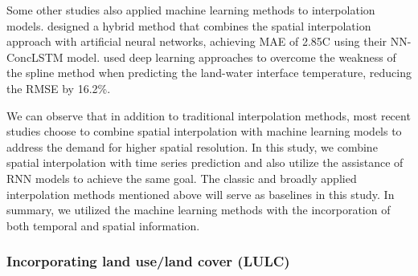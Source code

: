\documentclass[a4paper,fleqn]{cas-sc}
\begin{document}
Some other studies also applied machine learning methods to interpolation models. \cite{Kartal2022prediction} designed a hybrid method that combines the spatial interpolation approach with artificial neural networks, achieving MAE of 2.85\textdegree C using their NN-ConcLSTM model. \cite{imanian2023spatial} used deep learning approaches to overcome the weakness of the spline method when predicting the land-water interface temperature, reducing the RMSE by 16.2\%. 

We can observe that in addition to traditional interpolation methods, most recent studies choose to combine spatial interpolation with machine learning models to address the demand for higher spatial resolution. In this study, we combine spatial interpolation with time series prediction and also utilize the assistance of RNN models to achieve the same goal. The classic and broadly applied interpolation methods mentioned above will serve as baselines in this study. In summary, we utilized the machine learning methods with the incorporation of both temporal and spatial information.

\subsubsection{Incorporating land use/land cover (LULC)}
\end{document}
